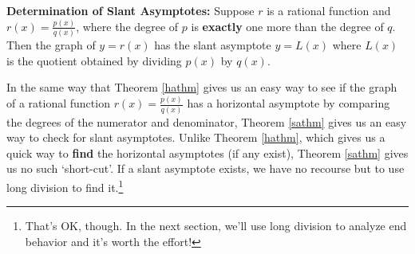 \documentclass{ximera}
\begin{document}

\begin{theorem} \textbf{Determination of Slant Asymptotes:} \label{sathm} Suppose $r$ is a rational function and $r(x) = \frac{p(x)}{q(x)}$, where the degree of $p$ is \textbf{exactly} one more than the degree of $q$.  Then the graph of $y=r(x)$ has  the slant asymptote $y=L(x)$ where $L(x)$ is the quotient obtained by dividing $p(x)$ by $q(x)$.

\end{theorem}



In the same way that Theorem \ref{hathm} gives us an easy way to see if the graph of a rational function $r(x) = \frac{p(x)}{q(x)}$ has a horizontal asymptote by comparing the degrees of the numerator and denominator, Theorem \ref{sathm} gives us an easy way to check for slant asymptotes.  Unlike Theorem \ref{hathm}, which gives us a quick way to \textbf{find} the horizontal asymptotes (if any exist), Theorem \ref{sathm} gives us no such `short-cut'.  If a slant asymptote exists, we have no recourse but to use long division to find it.\footnote{That's OK, though.  In the next section, we'll use long division to analyze end behavior and it's worth the effort!}  
\end{document}
